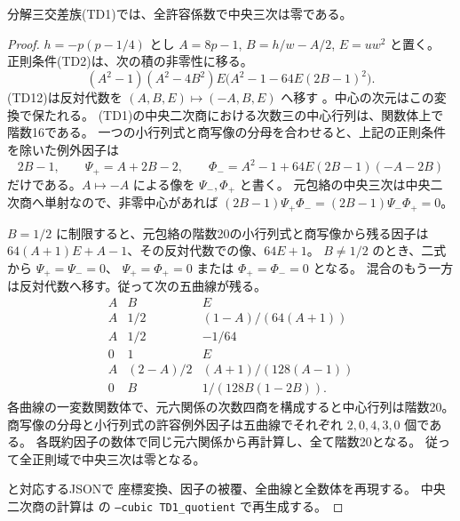 \begin{proposition}\label{prop:cubic-CY-one-segre-double-split-TD-excluded}
分解三交差族(TD1)では、全許容係数で中央三次は零である。
\end{proposition}
\begin{proof}
$h=-p(p-1/4)$ とし $A=8p-1$, $B=h/w-A/2$, $E=uw^2$ と置く。
正則条件(TD2)は、次の積の非零性に移る。
\[
 (A^2-1)(A^2-4B^2)E\bigl(A^2-1-64E(2B-1)^2\bigr).
\]
(TD12)は反対代数を $(A,B,E)\mapsto(-A,B,E)$ へ移す
\cite{AS4CYpinned}。中心の次元はこの変換で保たれる。
(TD1)の中央二次商における次数三の中心行列は、関数体上で階数16である。
一つの小行列式と商写像の分母を合わせると、上記の正則条件を除いた例外因子は
\[
 2B-1,\qquad \Psi_+=A+2B-2,\qquad
 \Phi_-=A^2-1+64E(2B-1)(-A-2B)
\]
だけである。$A\mapsto-A$ による像を $\Psi_-,\Phi_+$ と書く。
元包絡の中央三次は中央二次商へ単射なので、非零中心があれば
$(2B-1)\Psi_+\Phi_-=(2B-1)\Psi_-\Phi_+=0$。

$B=1/2$ に制限すると、元包絡の階数20の小行列式と商写像から残る因子は
$64(A+1)E+A-1$、その反対代数での像、$64E+1$。
$B\ne1/2$ のとき、二式から $\Psi_+=\Psi_-=0$、
$\Psi_+=\Phi_+=0$ または $\Phi_+=\Phi_-=0$ となる。
混合のもう一方は反対代数へ移す。従って次の五曲線が残る。
\[
\begin{array}{c|c|c}
 A & B & E\\ \hline
 A & 1/2 & (1-A)/(64(A+1))\\
 A & 1/2 & -1/64\\
 0 & 1 & E\\
 A & (2-A)/2 & (A+1)/(128(A-1))\\
 0 & B & 1/(128B(1-2B)).
\end{array}
\]
各曲線の一変数関数体で、元六関係の次数四商を構成すると中心行列は階数20。
商写像の分母と小行列式の許容例外因子は五曲線でそれぞれ $2,0,4,3,0$ 個である。
各既約因子の数体で同じ元六関係から再計算し、全て階数20となる。
従って全正則域で中央三次は零となる。

 と対応するJSONで
座標変換、因子の被覆、全曲線と全数体を再現する。
中央二次商の計算は
の \texttt{--cubic TD1\_quotient} で再生成する。
\end{proof}

